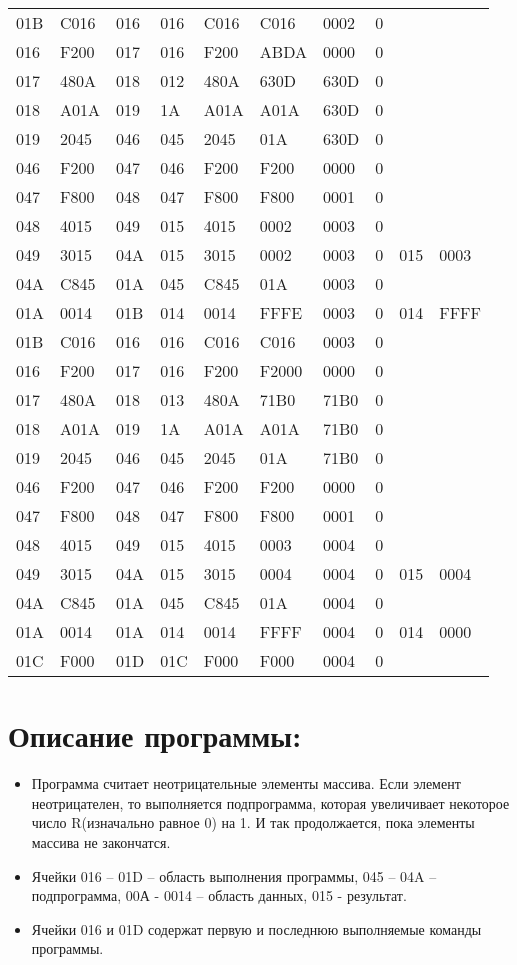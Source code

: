 \documentclass[a4paper,14pt]{article}
\begin{document}
\begin{tabular}{llllllllll}
01B &C016 &016 &016 &C016 &C016 &0002 &0\\
016 &F200 &017 &016 &F200 &ABDA &0000 &0\\
017 &480A &018 &012 &480A &630D &630D &0\\
018 &A01A &019 &1A &A01A &A01A &630D &0\\
019 &2045 &046 &045 &2045 &01A &630D &0\\
046 &F200 &047 &046 &F200 &F200 &0000 &0\\
047 &F800 &048 &047 &F800 &F800 &0001 &0\\
048 &4015 &049 &015 &4015 &0002 &0003 &0\\
049 &3015 &04A &015 &3015 &0002 &0003 &0 &015 &0003\\
04A &C845 &01A &045 &C845 &01A &0003 &0\\
01A &0014 &01B &014 &0014 &FFFE &0003 &0 &014 &FFFF\\
01B &C016 &016 &016 &C016 &C016 &0003 &0\\
016 &F200 &017 &016 &F200 &F2000 &0000 &0\\
017 &480A &018 &013 &480A &71B0 &71B0 &0\\
018 &A01A &019 &1A &A01A &A01A &71B0 &0\\
019 &2045 &046 &045 &2045 &01A &71B0 &0\\
046 &F200 &047 &046 &F200 &F200 &0000 &0\\
047 &F800 &048 &047 &F800 &F800 &0001 &0\\
048 &4015 &049 &015 &4015 &0003 &0004 &0\\
049 &3015 &04A &015 &3015 &0004 &0004 &0 &015 &0004\\
04A &C845 &01A &045 &C845 &01A &0004 &0\\
01A &0014 &01A &014 &0014 &FFFF &0004 &0 &014 &0000\\
01C &F000 &01D &01C &F000 &F000 &0004 &0\\

    \hline
\end{tabular}

\section {Описание программы:}
\begin{itemize}
\item Программа считает неотрицательные элементы массива. Если элемент неотрицателен, то выполняется подпрограмма, которая увеличивает некоторое число R(изначально равное 0) на 1. И так продолжается, пока элементы массива не закончатся.
\item Ячейки 016 – 01D – область выполнения программы, 045 – 04A – подпрограмма, 00А - 0014 – область данных, 015 - результат.
\item Ячейки 016 и 01D содержат первую и последнюю выполняемые команды программы.
\end{itemize}
\end{document}
